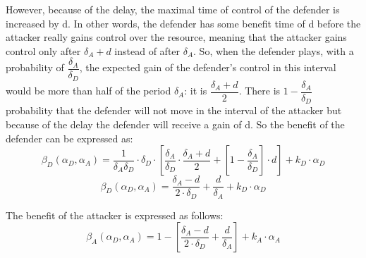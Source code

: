 However, because of the delay, the maximal time of control of the defender is increased by d. In other words, the defender has some benefit time of d before the attacker really gains control over the resource, meaning that the attacker gains control only after $\delta_{A}+d$ instead of after $\delta_{A}$. So, when the defender plays, with a probability of $\dfrac{\delta_{A} } {\delta_{D}} $, the expected gain of the defender's control in this interval would be more than half of the period $\delta_{A} $: it is $\dfrac{\delta_{A} + d}{2}$. There is $1- \dfrac{\delta_{A} } {\delta_{D}} $ probability that the defender will not move in the interval of the attacker but because of the delay the defender will receive a gain of d. So the benefit of the defender can be expressed as:
\begin{equation}\label{first}
\beta_{D}(\alpha_{D},\alpha_{A}) = \dfrac { 1} {\delta_{A} \delta_{D}} \cdot \delta_{D} \cdot [ \dfrac{\delta_{A} }{\delta_{D}} \cdot \dfrac{\delta_{A} + d}{2}+[ 1-\dfrac{\delta_{A}}{ \delta_{D}}] \cdot d ] + k_{D} \cdot \alpha_{D}
\end{equation}
\begin{equation}\label{first}
\beta_{D}(\alpha_{D},\alpha_{A}) = \dfrac {\delta_{A} - d}{2 \cdot \delta_{D}} + \dfrac{d}{\delta_{A}}  + k_{D} \cdot \alpha_{D}
\end{equation}

The benefit of the attacker is expressed as follows:
\begin{equation}\label{first}
\beta_{A}(\alpha_{D},\alpha_{A}) = 1- [ \dfrac {\delta_{A} - d}{2 \cdot \delta_{D}} + \dfrac{d}{\delta_{A}}  ] + k_{A} \cdot \alpha_{A}
\end{equation}



%
